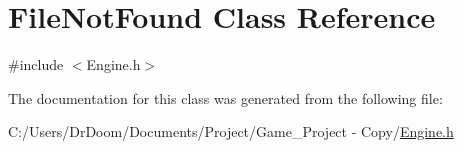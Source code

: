 \hypertarget{class_file_not_found}{}\section{File\+Not\+Found Class Reference}
\label{class_file_not_found}


{\ttfamily \#include $<$Engine.\+h$>$}



The documentation for this class was generated from the following file\+:\begin{DoxyCompactItemize}
\item 
C\+:/\+Users/\+Dr\+Doom/\+Documents/\+Project/\+Game\+\_\+\+Project -\/ Copy/\hyperlink{_engine_8h}{Engine.\+h}\end{DoxyCompactItemize}
